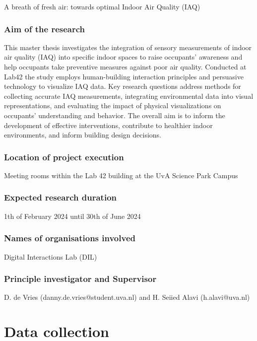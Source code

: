 \documentclass[a4paper]{article}
\begin{document}
A breath of fresh air: towards optimal Indoor Air Quality (IAQ)

\subsubsection{Aim of the research}

This master thesis investigates the integration of sensory measurements of indoor air quality (IAQ) into specific indoor spaces to raise occupants’ awareness and help occupants take preventive measures against poor air quality. Conducted at Lab42 the study employs human-building interaction principles and persuasive technology to visualize IAQ data. Key research questions address methods for collecting accurate IAQ measurements, integrating environmental data into visual representations, and evaluating the impact of physical visualizations on occupants’ understanding and behavior. The overall aim is to inform the development of effective interventions, contribute to healthier indoor environments, and inform building design decisions.

\subsubsection{Location of project execution}

Meeting rooms within the Lab 42 building at the UvA Science Park Campus

\subsubsection{Expected research duration}

1th of February 2024 until 30th of June 2024

\subsubsection{Names of organisations involved}

Digital Interactions Lab (DIL)

\subsubsection{Principle investigator and Supervisor}

D. de Vries (danny.de.vries@student.uva.nl) and H. Seiied Alavi (h.alavi@uva.nl)


\section*{Data collection}
\end{document}

